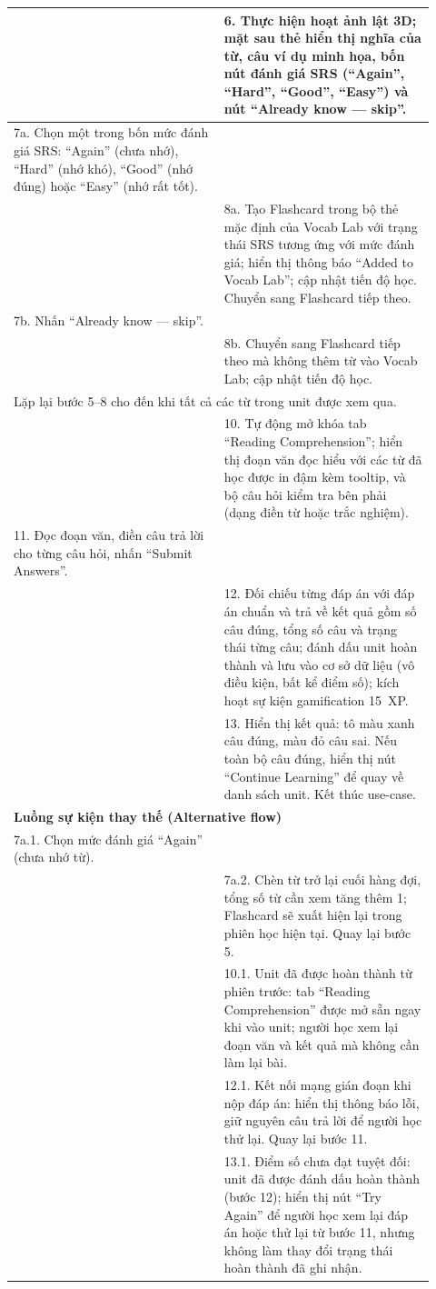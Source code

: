 \begin{longtable}{|p{0.46\linewidth}|p{0.46\linewidth}|}
    & 6. Thực hiện hoạt ảnh lật 3D; mặt sau thẻ hiển thị nghĩa của từ, câu ví dụ minh họa, bốn nút đánh giá SRS (``Again'', ``Hard'', ``Good'', ``Easy'') và nút ``Already know --- skip''. \\ \hline
    7a. Chọn một trong bốn mức đánh giá SRS: ``Again'' (chưa nhớ), ``Hard'' (nhớ khó), ``Good'' (nhớ đúng) hoặc ``Easy'' (nhớ rất tốt). & \\ \hline
    & 8a. Tạo Flashcard trong bộ thẻ mặc định của Vocab Lab với trạng thái SRS tương ứng với mức đánh giá; hiển thị thông báo ``Added to Vocab Lab''; cập nhật tiến độ học. Chuyển sang Flashcard tiếp theo. \\ \hline
    7b. Nhấn ``Already know --- skip''. & \\ \hline
    & 8b. Chuyển sang Flashcard tiếp theo mà không thêm từ vào Vocab Lab; cập nhật tiến độ học. \\ \hline
    \multicolumn{2}{|p{0.88\linewidth}|}{Lặp lại bước 5--8 cho đến khi tất cả các từ trong unit được xem qua.} \\ \hline
    & 10. Tự động mở khóa tab ``Reading Comprehension''; hiển thị đoạn văn đọc hiểu với các từ đã học được in đậm kèm tooltip, và bộ câu hỏi kiểm tra bên phải (dạng điền từ hoặc trắc nghiệm). \\ \hline
    11. Đọc đoạn văn, điền câu trả lời cho từng câu hỏi, nhấn ``Submit Answers''. & \\ \hline
    & 12. Đối chiếu từng đáp án với đáp án chuẩn và trả về kết quả gồm số câu đúng, tổng số câu và trạng thái từng câu; đánh dấu unit hoàn thành và lưu vào cơ sở dữ liệu (vô điều kiện, bất kể điểm số); kích hoạt sự kiện gamification 15~XP. \\ \hline
    & 13. Hiển thị kết quả: tô màu xanh câu đúng, màu đỏ câu sai. Nếu toàn bộ câu đúng, hiển thị nút ``Continue Learning'' để quay về danh sách unit. Kết thúc use-case. \\ \hline
    \multicolumn{2}{|l|}{\textbf{Luồng sự kiện thay thế (Alternative flow)}} \\ \hline
    7a.1. Chọn mức đánh giá ``Again'' (chưa nhớ từ). & \\ \hline
    & 7a.2. Chèn từ trở lại cuối hàng đợi, tổng số từ cần xem tăng thêm 1; Flashcard sẽ xuất hiện lại trong phiên học hiện tại. Quay lại bước 5. \\ \hline
    & 10.1. Unit đã được hoàn thành từ phiên trước: tab ``Reading Comprehension'' được mở sẵn ngay khi vào unit; người học xem lại đoạn văn và kết quả mà không cần làm lại bài. \\ \hline
    & 12.1. Kết nối mạng gián đoạn khi nộp đáp án: hiển thị thông báo lỗi, giữ nguyên câu trả lời để người học thử lại. Quay lại bước 11. \\ \hline
    & 13.1. Điểm số chưa đạt tuyệt đối: unit đã được đánh dấu hoàn thành (bước 12); hiển thị nút ``Try Again'' để người học xem lại đáp án hoặc thử lại từ bước 11, nhưng không làm thay đổi trạng thái hoàn thành đã ghi nhận. \\ \hline
\end{longtable}

